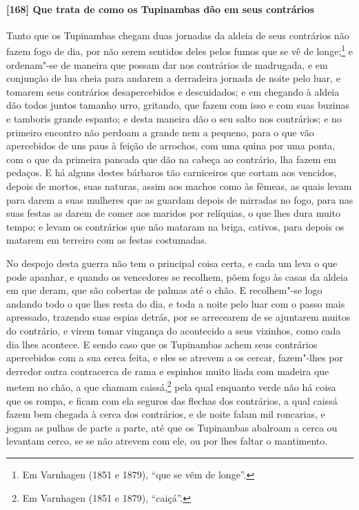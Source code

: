 \paragraph{[168] Que trata de como os Tupinambas dão em seus contrários}\quad
Tanto que os Tupinambas chegam duas jornadas da aldeia de seus contrários não fazem fogo
de dia, por não serem sentidos deles pelos fumos que se vê de longe;\footnote{ Em
Varnhagen (1851 e 1879), ``que se vêm de longe''.} e ordenam"-se de maneira que possam dar
nos contrários de madrugada, e em conjunção de lua cheia para andarem a derradeira jornada
de noite pelo luar, e tomarem seus contrários desapercebidos e descuidados; e em chegando
à aldeia dão todos juntos tamanho urro, gritando, que fazem com isso e com suas buzinas e
tamboris grande espanto; e desta maneira dão o seu salto nos contrários; e no primeiro
encontro não perdoam a grande nem a pequeno, para o que vão apercebidos de uns paus à
feição de arrochos, com uma quina por uma ponta, com o que da primeira pancada que dão na
cabeça ao contrário, lha fazem em pedaços. E há alguns destes bárbaros tão carniceiros que
cortam aos vencidos, depois de mortos, suas naturas, assim aos machos como às fêmeas, as
quais levam para darem a suas mulheres que as guardam depois de mirradas no fogo, para nas
suas festas as darem de comer aos maridos por relíquias, o que lhes dura muito tempo; e
levam os contrários que não mataram na briga, cativos, para depois os matarem em terreiro
com as festas costumadas.

No despojo desta guerra não tem o principal coisa certa, e cada um leva o que pode
apanhar, e quando os vencedores se recolhem, põem fogo às casas da aldeia em que deram,
que são cobertas de palmas até o chão. E recolhem"-se logo andando todo o que lhes resta do
dia, e toda a noite pelo luar com o passo mais apressado, trazendo suas espias detrás, por
se arrecearem de se ajuntarem muitos do contrário, e virem tomar vingança do acontecido a
seus vizinhos, como cada dia lhes acontece. E sendo caso que os Tupinambas achem seus
contrários apercebidos com a sua cerca feita, e eles se atrevem a os cercar, fazem"-lhes
por derredor outra contracerca de rama e espinhos muito liada com madeira que metem no
chão, a que chamam caissá,\footnote{ Em Varnhagen (1851 e 1879), ``caiçá''.} pela qual
enquanto verde não há coisa que os rompa, e ficam com ela seguros das flechas dos
contrários, a qual caissá fazem bem chegada à cerca dos contrários, e de noite falam mil
roncarias, e jogam as pulhas de parte a parte, até que os Tupinambas abalroam a cerca ou
levantam cerco, se se não atrevem com ele, ou por lhes faltar o mantimento.

